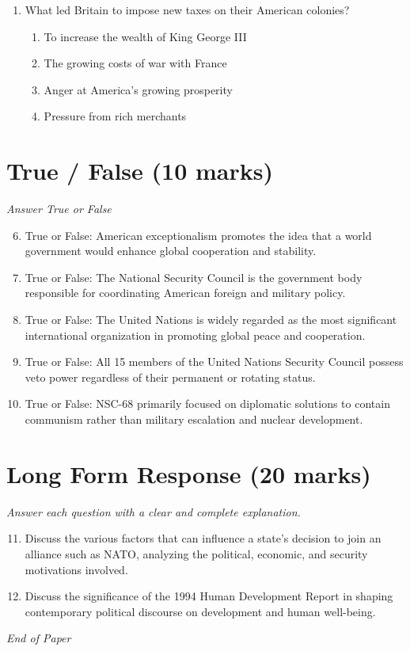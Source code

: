 \documentclass[12pt]{article}
\begin{document}
\begin{enumerate}[label=\arabic*.]
\begin{enumerate}[label=(\alph*)]
    \item It expanded NATO to include former Soviet states
    \item It focused on a more personal style of leadership
    \item It increased international support for the United States
\end{enumerate}
\item What led Britain to impose new taxes on their American colonies?
\begin{enumerate}[label=(\alph*)]
    \item To increase the wealth of King George III
    \item The growing costs of war with France
    \item Anger at America's growing prosperity
    \item Pressure from rich merchants
\end{enumerate}
\end{enumerate}

\section*{True / False (10 marks)}
\textit{Answer True or False}
\begin{enumerate}[label=\arabic*.]
\setcounter{enumi}{5}
\item True or False: American exceptionalism promotes the idea that a world government would enhance global cooperation and stability.
\item True or False: The National Security Council is the government body responsible for coordinating American foreign and military policy.
\item True or False: The United Nations is widely regarded as the most significant international organization in promoting global peace and cooperation.
\item True or False: All 15 members of the United Nations Security Council possess veto power regardless of their permanent or rotating status.
\item True or False: NSC-68 primarily focused on diplomatic solutions to contain communism rather than military escalation and nuclear development.
\end{enumerate}

\section*{Long Form Response (20 marks)}
\textit{Answer each question with a clear and complete explanation.}
\begin{enumerate}[label=\arabic*.]
\setcounter{enumi}{10}
\item Discuss the various factors that can influence a state's decision to join an alliance such as NATO, analyzing the political, economic, and security motivations involved.
\item Discuss the significance of the 1994 Human Development Report in shaping contemporary political discourse on development and human well-being.
\end{enumerate}

\vfill
\noindent\textit{End of Paper}
\end{document}
